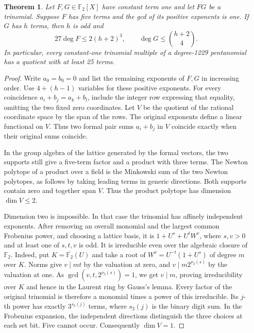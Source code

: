 \documentclass[11pt]{article}
\newtheorem{theorem}{Theorem}
\newcommand{\F}{\mathbb F_2}
\begin{document}
\begin{theorem}\label{thm:trinomial-quotient-weight}
Let \(F,G\in\F[X]\) have constant term one and let \(FG\) be a
trinomial. Suppose \(F\) has five terms and the gcd of its positive
exponents is one. If \(G\) has \(h\) terms, then \(h\) is odd and
\[
       27\deg F\le 2(h+2)^3,\qquad \deg G\le\binom{h+2}{4}.
\]
In particular, every constant-one trinomial multiple of a degree-1229
pentanomial has a quotient with at least 25 terms.
\end{theorem}
\begin{proof}
Write \(a_0=b_0=0\) and list the remaining exponents of \(F,G\) in
increasing order. Use \(4+(h-1)\) variables for these positive
exponents. For every coincidence \(a_i+b_j=a_k+b_l\), include the
integer row expressing that equality, omitting the two fixed zero
coordinates. Let \(V\) be the quotient of the rational coordinate
space by the span of the rows. The original exponents define a
linear functional on \(V\). Thus two formal pair sums \(a_i+b_j\)
in \(V\) coincide exactly when their original sums coincide.

In the group algebra of the lattice generated by the formal vectors,
the two supports still give a five-term factor and a product with three
terms. The Newton polytope of a product over a field is the Minkowski
sum of the two Newton polytopes, as follows by taking leading terms
in generic directions. Both supports contain zero and together span
\(V\). Thus the product polytope has dimension \(\dim V\le2\).

Dimension two is impossible. In that case the trinomial has affinely
independent exponents. After removing an overall monomial and the
largest common Frobenius power, and choosing a lattice basis, it is
\(1+U^s+U^t W^v\), where \(s,v>0\) and at least one of \(s,t,v\)
is odd. It is irreducible even over the algebraic closure of \(\F\).
Indeed, put \(K=\overline{\F}(U)\) and take a root of
\(W^v=U^{-t}(1+U^s)\) of degree \(m\) over \(K\). Norms give
\(v\mid mt\) by the valuation at zero, and \(v\mid m2^{\nu_2(s)}\)
by the valuation at one. As \(\gcd(v,t,2^{\nu_2(s)})=1\), we get
\(v\mid m\), proving irreducibility over \(K\) and hence in the Laurent
ring by Gauss's lemma. Every factor of the original trinomial is
therefore a monomial times a power of this irreducible. Its \(j\)-th
power has exactly \(3^{s_2(j)}\) terms, where \(s_2(j)\) is the
binary digit sum. In the Frobenius expansion, the independent
directions distinguish the three choices at each set bit. Five
cannot occur. Consequently \(\dim V=1\).


\end{proof}
\end{document}

